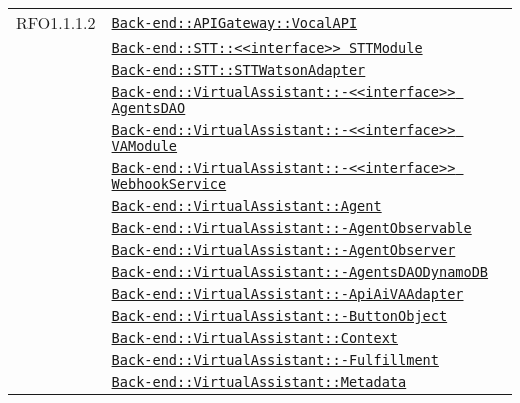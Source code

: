 \begin{longtable}{|>{\centering}m{3cm}|m{10cm}<{\centering}|}
RFO1.1.1.2 & \hyperref[Back-end::APIGateway::VocalAPI]{\texttt{Back-end::APIGateway::VocalAPI}}\\
& \hyperref[Back-end::STT::<<interface>> STTModule]{\texttt{Back-end::STT::<<interface>> STTModule}}\\
& \hyperref[Back-end::STT::STTWatsonAdapter]{\texttt{Back-end::STT::STTWatsonAdapter}}\\
& \hyperref[Back-end::VirtualAssistant::<<interface>> AgentsDAO]{\texttt{Back-end::VirtualAssistant::-\linebreak <<interface>> AgentsDAO}}\\
& \hyperref[Back-end::VirtualAssistant::<<interface>> VAModule]{\texttt{Back-end::VirtualAssistant::-\linebreak <<interface>> VAModule}}\\
& \hyperref[Back-end::VirtualAssistant::<<interface>> WebhookService]{\texttt{Back-end::VirtualAssistant::-\linebreak <<interface>> WebhookService}}\\
& \hyperref[Back-end::VirtualAssistant::Agent]{\texttt{Back-end::VirtualAssistant::Agent}}\\
& \hyperref[Back-end::VirtualAssistant::AgentObservable]{\texttt{Back-end::VirtualAssistant::-\linebreak AgentObservable}}\\
& \hyperref[Back-end::VirtualAssistant::AgentObserver]{\texttt{Back-end::VirtualAssistant::-\linebreak AgentObserver}}\\
& \hyperref[Back-end::VirtualAssistant::AgentsDAODynamoDB]{\texttt{Back-end::VirtualAssistant::-\linebreak AgentsDAODynamoDB}}\\
& \hyperref[Back-end::VirtualAssistant::ApiAiVAAdapter]{\texttt{Back-end::VirtualAssistant::-\linebreak ApiAiVAAdapter}}\\
& \hyperref[Back-end::VirtualAssistant::ButtonObject]{\texttt{Back-end::VirtualAssistant::-\linebreak ButtonObject}}\\
& \hyperref[Back-end::VirtualAssistant::Context]{\texttt{Back-end::VirtualAssistant::Context}}\\
& \hyperref[Back-end::VirtualAssistant::Fulfillment]{\texttt{Back-end::VirtualAssistant::-\linebreak Fulfillment}}\\
& \hyperref[Back-end::VirtualAssistant::Metadata]{\texttt{Back-end::VirtualAssistant::Metadata}}\\

\end{longtable}
